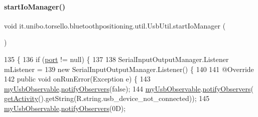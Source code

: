 \paragraph{\texorpdfstring{start\+Io\+Manager()}{startIoManager()}}
{\footnotesize\ttfamily void it.\+unibo.\+torsello.\+bluetoothpositioning.\+util.\+Usb\+Util.\+start\+Io\+Manager (\begin{DoxyParamCaption}{ }\end{DoxyParamCaption})\hspace{0.3cm}{\ttfamily [private]}}


\begin{DoxyCode}
135                                   \{
136         \textcolor{keywordflow}{if} (\hyperlink{classit_1_1unibo_1_1torsello_1_1bluetoothpositioning_1_1util_1_1UsbUtil_a49aef08510b6d48d627670d834099c36_a49aef08510b6d48d627670d834099c36}{port} != null) \{
137 
138             SerialInputOutputManager.Listener mListener =
139                     \textcolor{keyword}{new} SerialInputOutputManager.Listener() \{
140 
141                         @Override
142                         \textcolor{keyword}{public} \textcolor{keywordtype}{void} onRunError(Exception e) \{
143                             \hyperlink{classit_1_1unibo_1_1torsello_1_1bluetoothpositioning_1_1util_1_1UsbUtil_a1c500d0f1a3f3a11b16015acc49929e0_a1c500d0f1a3f3a11b16015acc49929e0}{myUsbObservable}.\hyperlink{classit_1_1unibo_1_1torsello_1_1bluetoothpositioning_1_1observables_1_1UsbMeasurementObservable_abcb4f86ee4b212c3dbc0a814e989ab73_abcb4f86ee4b212c3dbc0a814e989ab73}{notifyObservers}(\textcolor{keyword}{false});
144                             \hyperlink{classit_1_1unibo_1_1torsello_1_1bluetoothpositioning_1_1util_1_1UsbUtil_a1c500d0f1a3f3a11b16015acc49929e0_a1c500d0f1a3f3a11b16015acc49929e0}{myUsbObservable}.\hyperlink{classit_1_1unibo_1_1torsello_1_1bluetoothpositioning_1_1observables_1_1UsbMeasurementObservable_abcb4f86ee4b212c3dbc0a814e989ab73_abcb4f86ee4b212c3dbc0a814e989ab73}{notifyObservers}(
      \hyperlink{classit_1_1unibo_1_1torsello_1_1bluetoothpositioning_1_1util_1_1UsbUtil_a625b1885830a4d2c359a534834a46648_a625b1885830a4d2c359a534834a46648}{getActivity}().getString(R.string.usb\_device\_not\_connected));
145                             \hyperlink{classit_1_1unibo_1_1torsello_1_1bluetoothpositioning_1_1util_1_1UsbUtil_a1c500d0f1a3f3a11b16015acc49929e0_a1c500d0f1a3f3a11b16015acc49929e0}{myUsbObservable}.\hyperlink{classit_1_1unibo_1_1torsello_1_1bluetoothpositioning_1_1observables_1_1UsbMeasurementObservable_abcb4f86ee4b212c3dbc0a814e989ab73_abcb4f86ee4b212c3dbc0a814e989ab73}{notifyObservers}(0D);

\end{DoxyCode}
